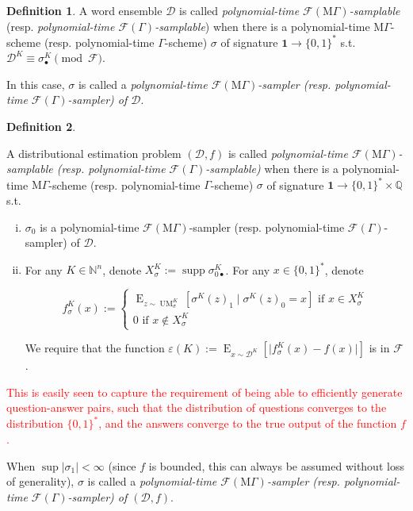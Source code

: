 \documentclass[11pt]{article}
\numberwithin{equation}{section}
\theoremstyle{definition}
\newtheorem{definition}{Definition}[section]
\theoremstyle{plain}
\newcommand{\Bool}{\{0,1\}}
\newcommand{\Words}{{\Bool^*}}
\DeclareMathOperator{\Supp}{supp}
\DeclareMathOperator{\E}{E}
\DeclareMathOperator{\UM}{UM}
\newcommand{\Nats}{\mathbb{N}}
\newcommand{\Rats}{\mathbb{Q}}
\newcommand{\Abs}[1]{\lvert #1 \rvert}
\newcommand{\Dist}{\mathcal{D}}
\newcommand{\MGrow}{\mathrm{M}\Gamma}
\newcommand{\Fall}{\mathcal{F}}
\newcommand{\EG}{\Fall(\Gamma)}
\newcommand{\EMG}{\Fall(\MGrow)}
\begin{document}
\begin{samepage}
\begin{definition}

A word ensemble $\Dist$ is called \emph{polynomial-time $\EMG$-samplable} (resp. \emph{polynomial-time $\EG$-samplable}) when there is a polynomial-time $\MGrow$-scheme (resp. polynomial-time $\Gamma$-scheme) $\sigma$ of signature ${\bm{1} \rightarrow \Words}$  s.t. $\Dist^{K} \equiv \sigma_\bullet^K \pmod \Fall$.

In this case, $\sigma$ is called a \emph{polynomial-time $\EMG$-sampler (resp. polynomial-time $\EG$-sampler) of $\Dist$}.

\end{definition}
\end{samepage}

\begin{samepage}
\begin{definition}
\label{def:smp_prob}

A distributional estimation problem $(\Dist,f)$ is called \emph{polynomial-time $\EMG$-samplable (resp. polynomial-time $\EG$-samplable)} when there is a polynomial-time $\MGrow$-scheme (resp. polynomial-time $\Gamma$-scheme) $\sigma$ of signature $\bm{1} \rightarrow \Words \times \Rats$ s.t. 

\begin{enumerate}[(i)]

\item $\sigma_0$ is a polynomial-time $\EMG$-sampler (resp. polynomial-time $\EG$-sampler) of $\Dist$.

\item For any $K \in \Nats^n$, denote $X_{\sigma}^K:=\Supp \sigma_{0\bullet}^K$. For any $x \in \Words$, denote 

$$f_\sigma^K(x):=\begin{cases}\E_{z \sim\UM_\sigma^K}[\sigma^K(z)_1 \mid \sigma^K(z)_0 = x] \text{ if } x \in X_{\sigma}^K \\ 0 \text{ if } x \not\in X_{\sigma}^K \end{cases}$$

We require that the function $\varepsilon(K):=\E_{x \sim \Dist^{K}}[\Abs{f_\sigma^K(x)-f(x)}]$ is in $\Fall$.

\end{enumerate}

\textcolor{red}{This is easily seen to capture the requirement of being able to efficiently generate question-answer pairs, such that the distribution of questions converges to the distribution $\Words$, and the answers converge to the true output of the function $f$.}

When $\sup{\Abs{\sigma_1}} < \infty$ (since $f$ is bounded, this can always be assumed without loss of generality), $\sigma$ is called a \emph{polynomial-time $\EMG$-sampler (resp. polynomial-time $\EG$-sampler) of $(\Dist,f)$}.

\end{definition}
\end{samepage}
\end{document}
